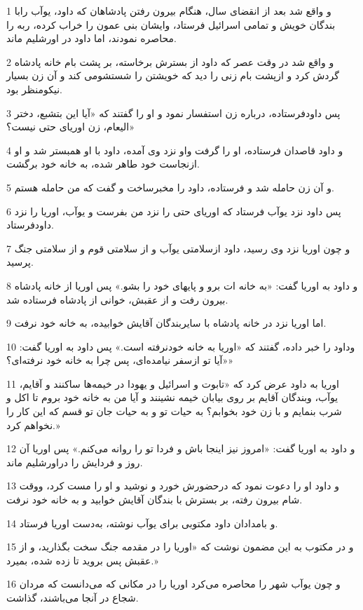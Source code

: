 \par 1 و واقع شد بعد از انقضای سال، هنگام بیرون رفتن پادشاهان که داود، یوآب رابا بندگان خویش و تمامی اسرائیل فرستاد، وایشان بنی عمون را خراب کرده، ربه را محاصره نمودند، اما داود در اورشلیم ماند.
\par 2 و واقع شد در وقت عصر که داود از بسترش برخاسته، بر پشت بام خانه پادشاه گردش کرد و ازپشت بام زنی را دید که خویشتن را شستشومی کند و آن زن بسیار نیکومنظر بود.
\par 3 پس داودفرستاده، درباره زن استفسار نمود و او را گفتند که «آیا این بتشبع، دختر الیعام، زن اوریای حتی نیست؟»
\par 4 و داود قاصدان فرستاده، او را گرفت واو نزد وی آمده، داود با او همبستر شد و او ازنجاست خود طاهر شده، به خانه خود برگشت.
\par 5 و آن زن حامله شد و فرستاده، داود را مخبرساخت و گفت که من حامله هستم.
\par 6 پس داود نزد یوآب فرستاد که اوریای حتی را نزد من بفرست و یوآب، اوریا را نزد داودفرستاد.
\par 7 و چون اوریا نزد وی رسید، داود ازسلامتی یوآب و از سلامتی قوم و از سلامتی جنگ پرسید.
\par 8 و داود به اوریا گفت: «به خانه ات برو و پایهای خود را بشو.» پس اوریا از خانه پادشاه بیرون رفت و از عقبش، خوانی از پادشاه فرستاده شد.
\par 9 اما اوریا نزد در خانه پادشاه با سایربندگان آقایش خوابیده، به خانه خود نرفت.
\par 10 وداود را خبر داده، گفتند که «اوریا به خانه خودنرفته است.» پس داود به اوریا گفت: «آیا تو ازسفر نیامده‌ای، پس چرا به خانه خود نرفته‌ای؟»
\par 11 اوریا به داود عرض کرد که «تابوت و اسرائیل و یهودا در خیمه‌ها ساکنند و آقایم، یوآب، وبندگان آقایم بر روی بیابان خیمه نشینند و آیا من به خانه خود بروم تا اکل و شرب بنمایم و با زن خود بخوابم؟ به حیات تو و به حیات جان تو قسم که این کار را نخواهم کرد.»
\par 12 و داود به اوریا گفت: «امروز نیز اینجا باش و فردا تو را روانه می‌کنم.» پس اوریا آن روز و فردایش را دراورشلیم ماند.
\par 13 و داود او را دعوت نمود که درحضورش خورد و نوشید و او را مست کرد، ووقت شام بیرون رفته، بر بسترش با بندگان آقایش خوابید و به خانه خود نرفت.
\par 14 و بامدادان داود مکتوبی برای یوآب نوشته، به‌دست اوریا فرستاد.
\par 15 و در مکتوب به این مضمون نوشت که «اوریا را در مقدمه جنگ سخت بگذارید، و از عقبش پس بروید تا زده شده، بمیرد.»
\par 16 و چون یوآب شهر را محاصره می‌کرد اوریا را در مکانی که می‌دانست که مردان شجاع در آنجا می‌باشند، گذاشت.
